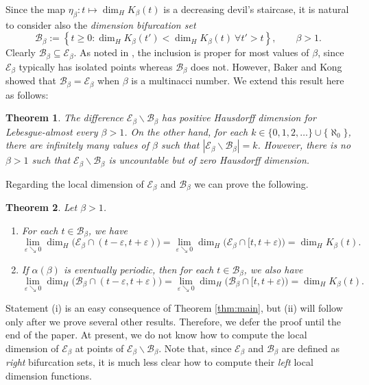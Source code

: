\documentclass[11pt]{amsart}
\newtheorem{theorem}{Theorem}[section]
\theoremstyle{definition}
\theoremstyle{remark}
\numberwithin{equation}{section}
\newcommand{\BB}{\mathscr{B}}
\newcommand{\EE}{\mathscr{E}}
\newcommand{\set}[1]{\left\{#1\right\}}
\newcommand{\ep}{\varepsilon}
\newcommand{\al}{\alpha}
\begin{document}
Since the map $\eta_\beta: t\mapsto \dim_H K_\beta(t)$ is a decreasing devil's staircase, it is natural to consider also the {\em dimension bifurcation set}
\[
\BB_\beta:=\set{t\ge 0: \dim_H K_\beta(t')<\dim_H K_\beta(t)~\forall t'>t}, \qquad \beta{>1}.
\]
Clearly $\BB_\beta\subseteq \EE_\beta$. As noted in \cite{Kalle-Kong-Langeveld-Li-18}, the inclusion is proper for most values of $\beta$, since $\EE_\beta$ typically has isolated points whereas $\BB_\beta$ does not. However, Baker and Kong \cite{Baker-Kong-2020} showed that $\BB_\beta=\EE_\beta$ when $\beta$ is a multinacci number. We extend this result here as follows:

\begin{theorem} \label{thm:size-of-E-minus-B}
The difference $\EE_\beta\backslash\BB_\beta$ has positive Hausdorff dimension for Lebesgue-almost every $\beta{>1}$. On the other hand, for each $k\in\{0,1,2,\dots\}\cup\{\aleph_0\}$, there are infinitely many values of $\beta$ such that $|\EE_\beta\backslash\BB_\beta|=k$. However, there is no $\beta{>1}$ such that $\EE_\beta\backslash\BB_\beta$ is uncountable but of zero Hausdorff dimension.
\end{theorem}

Regarding the local dimension of $\EE_\beta$ and $\BB_\beta$ we can prove the following.

\begin{theorem} \label{thm:local-dimension}
Let $\beta{>1}$.
\begin{enumerate}[{\rm(i)}]
\item For each $t\in\BB_\beta$, we have
\[
\lim_{\ep\searrow 0}\dim_H\big(\EE_\beta\cap(t-\ep,t+\ep)\big)=\lim_{\ep\searrow 0}\dim_H\big(\EE_\beta\cap[t,t+\ep)\big)=\dim_H K_\beta(t).
\]
\item If $\al(\beta)$ is eventually periodic, then for each $t\in\BB_\beta$, we also have
\[
\lim_{\ep\searrow 0}\dim_H\big(\BB_\beta\cap(t-\ep,t+\ep)\big)=\lim_{\ep\searrow 0}\dim_H\big(\BB_\beta\cap[t,t+\ep)\big)=\dim_H K_\beta(t).
\]
\end{enumerate}
\end{theorem}

Statement (i) is an easy consequence of Theorem \ref{thm:main}, but (ii) will follow only after we prove several other results. Therefore, we defer the proof until the end of the paper. At present, we do not know how to compute the local dimension of $\EE_\beta$ at points of $\EE_\beta\backslash\BB_\beta$. Note that, since $\EE_\beta$ and $\BB_\beta$ are defined as {\em right} bifurcation sets, it is much less clear how to compute their {\em left} local dimension functions.
\end{document}

